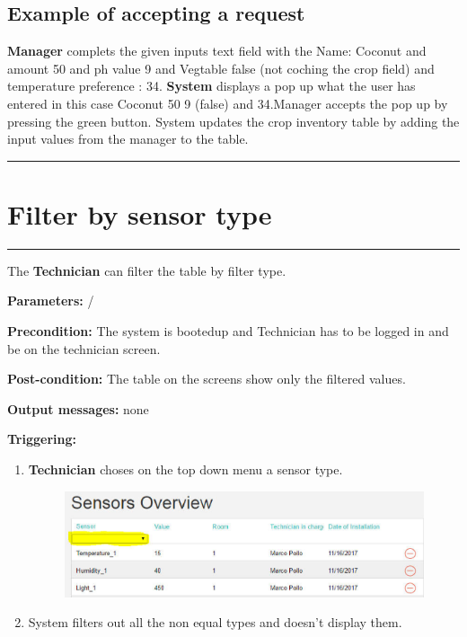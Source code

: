 \subsection{Example of accepting a request}
\textbf{Manager} complets the given inputs text field with the
Name: Coconut and amount 50 and ph value 9 and Vegtable false
(not coching the crop field) and temperature preference : 34. \textbf{System}
displays a pop up  what the user has entered in this case Coconut 50 9 (false)
and 34.Manager accepts the pop up by pressing the green button. System updates
the crop inventory table by adding the input values from the manager to the
table.
\hfill
\vspace{0.5cm}
\hrule












\break

\section{Filter by sensor type}

\hrule
\hfill
\vspace{0.5cm}

\label{operation:filterSensorTable}

The \textbf{Technician} can filter the table by filter type.
\begin{description}

\item \textbf{Parameters:} /
\item \textbf{Precondition:} The system is bootedup and Technician has to be
logged in and be on the technician screen.
\item \textbf{Post-condition:} The table on the screens show only the filtered
values.
\item \textbf{Output messages:} none
\item \textbf{Triggering:}
\begin{enumerate}
\item \textbf{Technician} choses on the top down menu a sensor type.
\begin{figure}[H]
\includegraphics[width=1\textwidth]{images/FilterSensorByTypeTechnician.eps}
\end{figure}
\item System filters out all the non equal types and doesn't display them.
\end{enumerate}
\end{description}


